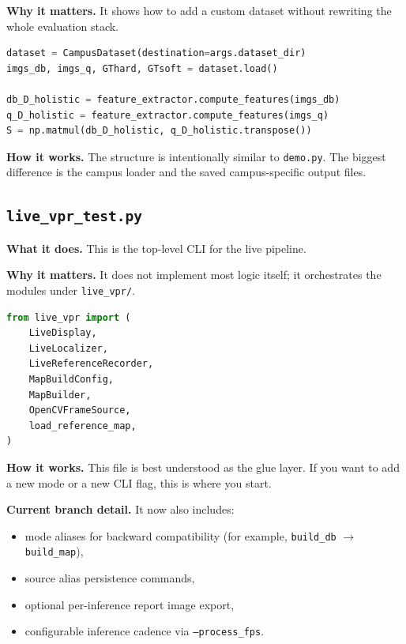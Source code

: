 \documentclass[11pt]{article}
\newcommand{\file}[1]{\texttt{#1}}
\begin{document}
\textbf{Why it matters.} It shows how to add a custom dataset without rewriting the whole evaluation stack.

\begin{lstlisting}[style=repo, language=Python, caption={Campus script follows the same flow as \file{demo.py}}]
dataset = CampusDataset(destination=args.dataset_dir)
imgs_db, imgs_q, GThard, GTsoft = dataset.load()

db_D_holistic = feature_extractor.compute_features(imgs_db)
q_D_holistic = feature_extractor.compute_features(imgs_q)
S = np.matmul(db_D_holistic, q_D_holistic.transpose())
\end{lstlisting}

\textbf{How it works.} The structure is intentionally similar to \file{demo.py}. The biggest difference is the campus loader and the saved campus-specific output files.

\subsection{\file{live\_vpr\_test.py}}
\textbf{What it does.} This is the top-level CLI for the live pipeline.

\textbf{Why it matters.} It does not implement most logic itself; it orchestrates the modules under \file{live\_vpr/}.

\begin{lstlisting}[style=repo, language=Python, caption={The live CLI wires together modular components}]
from live_vpr import (
    LiveDisplay,
    LiveLocalizer,
    LiveReferenceRecorder,
    MapBuildConfig,
    MapBuilder,
    OpenCVFrameSource,
    load_reference_map,
)
\end{lstlisting}

\textbf{How it works.} This file is best understood as the glue layer. If you want to add a new mode or a new CLI flag, this is where you start.

\textbf{Current branch detail.} It now also includes:
\begin{itemize}[leftmargin=*]
  \item mode aliases for backward compatibility (for example, \texttt{build\_db} $\rightarrow$ \texttt{build\_map}),
  \item source alias persistence commands,
  \item optional per-inference report image export,
  \item configurable inference cadence via \texttt{--process\_fps}.
\end{itemize}
\end{document}
